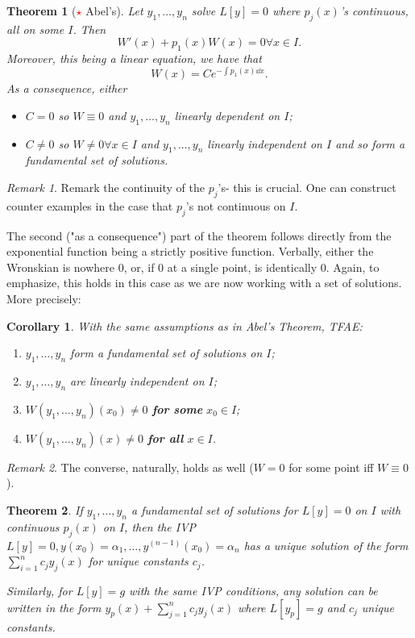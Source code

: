 \documentclass[12pt, oneside]{article}
\theoremstyle{definition}
\theoremstyle{plain}
\newtheorem{thm}{Theorem}
\newtheorem{cor}{Corollary}
\theoremstyle{remark}
\newtheorem{remark}{Remark}
\begin{document}
\begin{thm}[\textcolor{red}{$\star$} Abel's]
  Let $y_1, \dots, y_n$ solve $L[y] = 0$ where $p_j(x)$'s continuous, all on some $I$. Then \[
  W'(x) + p_1(x) W(x) = 0 \forall x \in I.  
  \] 
  Moreover, this being a linear equation, we have that \[
  W(x) = Ce^{- \int p_1(x) \dd{x}}.
  \]
  As a consequence, either \begin{itemize}
    \item $C = 0$ so $W \equiv 0$ and $y_1, \dots, y_n$ linearly dependent on $I$;
    \item $C \neq 0$ so $W \neq 0 \forall x \in I$ and $y_1, \dots, y_n$ linearly independent on $I$ and so form a fundamental set of solutions.
  \end{itemize}
\end{thm}

\begin{remark}
Remark the continuity of the $p_j$'s- this is crucial. One can construct counter examples in the case that $p_j$'s not continuous on $I$.

The second ("as a consequence") part of the theorem follows directly from the exponential function being a strictly positive function. Verbally, either the Wronskian is nowhere 0, or, if 0 at a single point, is identically 0. Again, to emphasize, this holds in this case as we are now working with a set of solutions. More precisely:
\end{remark}

\begin{cor}
With the same assumptions as in Abel's Theorem, TFAE: \begin{enumerate}
  \item $y_1, \dots, y_n$ form a fundamental set of solutions on $I$;
  \item $y_1, \dots, y_n$ are linearly independent on $I$;
  \item $W(y_1, \dots, y_n)(x_0) \neq 0$ \textbf{for some} $x_0 \in I$;
  \item $W(y_1, \dots, y_n)(x) \neq 0$ \textbf{for all} $x \in I$.
\end{enumerate}
\end{cor}

\begin{remark}
  The converse, naturally, holds as well ($W = 0$ for some point iff $W \equiv 0$).
\end{remark}

\begin{thm}
  If $y_1, \dots, y_n$ a fundamental set of solutions for $L[y] = 0$ on $I$ with continuous $p_j(x)$ on $I$, then the IVP $L[y] = 0, y(x_0) = \alpha_1, \dots, y^{(n-1)}(x_0) = \alpha_n$ has a unique solution of the form $\sum_{i=1}^n c_j y_j(x)$ for unique constants $c_j$.

  Similarly, for $L[y] = g$ with the same IVP conditions, any solution can be written in the form $y_p(x) + \sum_{j=1}^n c_j y_j(x)$ where $L[y_p] = g$ and $c_j$ unique constants.
\end{thm}
\end{document}
